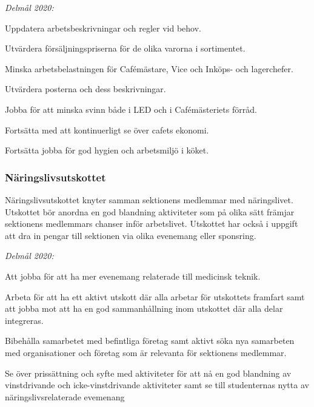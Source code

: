 \documentclass[10pt]{article}
\begin{document}
    \emph{Delmål 2020:}
    \begin{dashlist}
        \item Uppdatera arbetsbeskrivningar och regler vid behov. 
        \item Utvärdera försäljningspriserna för de olika varorna i sortimentet. 
        \item Minska arbetsbelastningen för Cafémästare, Vice och Inköps- och lagerchefer.
        \item Utvärdera posterna och dess beskrivningar.
        \item Jobba för att minska svinn både i LED och i Cafémästeriets förråd.
        \item Fortsätta med att kontinuerligt se över cafets ekonomi. 
        \item Fortsätta jobba för god hygien och arbetsmiljö i köket.
    \end{dashlist}
    
    \subsubsection*{Näringslivsutskottet}
    Näringslivsutskottet knyter samman sektionens medlemmar med näringslivet. Utskottet bör anordna en god blandning aktiviteter som på olika sätt främjar sektionens medlemmars chanser inför arbetslivet. Utskottet har också i uppgift att dra in pengar till sektionen via olika evenemang eller sponsring. 
    
    \emph{Delmål 2020:}
    \begin{dashlist}
        \item Att jobba för att ha mer evenemang relaterade till medicinsk teknik.
        \item Arbeta för att ha ett aktivt utskott där alla arbetar för utskottets framfart samt att jobba mot att ha en god sammanhållning inom utskottet där alla delar integreras.
        \item Bibehålla samarbetet med befintliga företag samt aktivt söka nya samarbeten med organisationer och företag som är relevanta för sektionens medlemmar.
        \item Se över prissättning och syfte med aktiviteter för att nå en god blandning av vinstdrivande och icke-vinstdrivande aktiviteter samt se till studenternas nytta av näringslivsrelaterade evemenang
    \end{dashlist}
    
\end{document}
